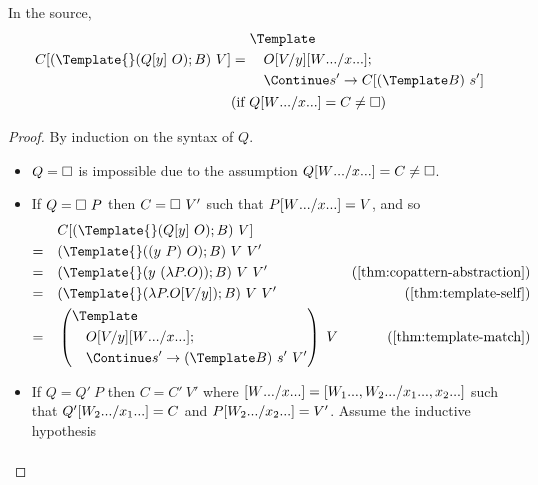 \begin{lemma}
  \label{thm:context-match}
  In the source,
  \begin{align*}
    C[(\Template{} (Q[y] ~ O); B) ~ V]
    &=
    \begin{aligned}
      &\Template \\
      &\quad O\subst{y}{V}\subst{\many{x}}{\many{W}}; \\
      &\quad \Continue s' \to C[(\Template B) ~ s']
    \end{aligned}
    \\
    &(\text{if } Q\subst{\many{x}}{\many{W}} = C \neq \hole)
  \end{align*}
\end{lemma}
\begin{proof}
  By induction on the syntax of $Q$.
  \begin{itemize}
  \item $Q = \hole$ is impossible due to the assumption $Q\subst{\many{x}}{\many{W}} = C \neq \hole$.
  \item If $Q = \hole ~ P$ then $C = \hole ~ V'$ such that $P\subst{\many{x}}{\many{W}} = V$, and so
    \begin{align*}
      &\quad
      C[(\Template{} (Q[y] ~ O); B) ~ V]
      \\
      =&\quad
      (\Template{} ((y ~ P) ~ O); B) ~ V ~ V'
      \\
      =&\quad
      (\Template{} (y ~ (\lambda P. O)); B) ~ V ~ V'
      &(\cref{thm:copattern-abstraction})
      \\
      =&\quad
      (\Template{} (\lambda P. O\subst{y}{V}); B) ~ V ~ V'
      &(\cref{thm:template-self})
      \\
      =&\quad
      \left(
        \begin{aligned}
          &\Template \\
          &\quad O\subst{y}{V}\subst{\many{x}}{\many{W}}; \\
          &\quad \Continue s' \to (\Template B) ~ s' ~ V'
        \end{aligned}
      \right)
      ~ V
      &(\cref{thm:template-match})
    \end{align*}
  \item If $Q = Q' ~ P$ then $C = C' ~ V'$ where $\subst{\many{x}}{\many{W}} = \subst{\many{x_1},\many{x_2}}{\many{W_1},\many{W_2}}$ such that $Q'\subst{\many{x_1}}{\many{W_2}} = C$ and $P\subst{\many{x_2}}{\many{W_2}} = V'$.
    Assume the inductive hypothesis
    \begin{align*}

\end{align*}
\end{itemize}
\end{proof}
